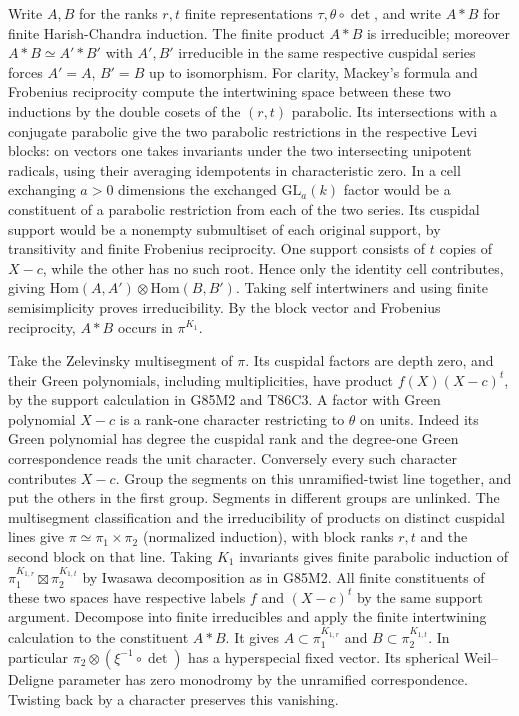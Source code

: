 Write $A,B$ for the ranks $r,t$ finite representations
$\tau,\theta\circ\det$, and write $A*B$ for finite
Harish-Chandra induction. The finite product $A*B$ is irreducible;
moreover $A*B\simeq A'*B'$ with $A',B'$ irreducible in the same
respective cuspidal series forces $A'=A$, $B'=B$ up to
isomorphism. For clarity, Mackey's formula and Frobenius
reciprocity compute the intertwining space between these two
inductions by the double cosets of the $(r,t)$ parabolic.
Its intersections with a conjugate parabolic give the two
parabolic restrictions in the respective Levi blocks: on vectors
one takes invariants under the two intersecting unipotent radicals,
using their averaging idempotents in characteristic zero. In a cell
exchanging $a>0$ dimensions the exchanged $\mathrm{GL}_a(k)$
factor would be a constituent of a parabolic restriction from
each of the two series. Its cuspidal support would be a nonempty
submultiset of each original support, by transitivity and finite
Frobenius reciprocity. One support consists of $t$ copies of
$X-c$, while the other has no such root. Hence only the identity
cell contributes, giving
$\mathrm{Hom}(A,A')\otimes\mathrm{Hom}(B,B')$. Taking self
intertwiners and using finite semisimplicity proves irreducibility.
By the block vector and Frobenius reciprocity, $A*B$ occurs in
$\pi^{K_1}$.

Take the Zelevinsky multisegment of $\pi$. Its cuspidal factors
are depth zero, and their Green polynomials, including
multiplicities, have product $f(X)(X-c)^t$, by the support
calculation in G85M2 and T86C3. A factor with Green polynomial
$X-c$ is a rank-one character restricting to $\theta$ on units.
Indeed its Green polynomial has degree the cuspidal rank and
the degree-one Green correspondence reads the unit character.
Conversely every such character contributes $X-c$. Group the
segments on this unramified-twist line together, and put the
others in the first group. Segments in different groups are
unlinked. The multisegment classification and the irreducibility
of products on distinct cuspidal lines give
$\pi\simeq\pi_1\times\pi_2$ (normalized induction), with block
ranks $r,t$ and the second block on that line. Taking $K_1$
invariants gives finite parabolic induction of
$\pi_1^{K_{1,r}}\boxtimes\pi_2^{K_{1,t}}$ by Iwasawa
decomposition as in G85M2. All finite constituents of these two
spaces have respective labels $f$ and $(X-c)^t$ by the same
support argument. Decompose into finite irreducibles and apply
the finite intertwining calculation to the constituent $A*B$.
It gives $A\subset\pi_1^{K_{1,r}}$ and
$B\subset\pi_2^{K_{1,t}}$. In particular
$\pi_2\otimes(\xi^{-1}\circ\det)$ has a hyperspecial fixed
vector. Its spherical Weil--Deligne parameter has zero monodromy
by the unramified correspondence. Twisting back by a character
preserves this vanishing.

